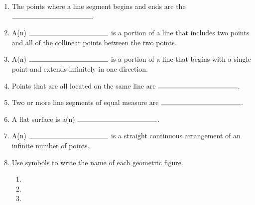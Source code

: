 \documentclass[12pt, oneside]{article}
\begin{document}
\begin{enumerate}
  \newpage
    \item The points where a line segment begins and ends are the $\rule{4cm}{0.15mm}$. \bigskip
    \item A(n) $\rule{4cm}{0.15mm}$ is a portion of a line that includes two points and all of the collinear points between the two points.\bigskip
    \item A(n) $\rule{4cm}{0.15mm}$ is a portion of a line that begins with a single point and extends infinitely in one direction.
    \item Points that are all located on the same line are $\rule{4cm}{0.15mm}$.\bigskip
    \item Two or more line segments of equal measure are $\rule{4cm}{0.15mm}$.\bigskip
    \item A flat surface is a(n) $\rule{4cm}{0.15mm}$. \bigskip
    \item A(n) $\rule{4cm}{0.15mm}$ is a straight continuous arrangement of an infinite number of points.
    \bigskip
  \item Use symbols to write the name of each geometric figure.
  \begin{enumerate}
  \item %
     \bigskip
  \item \hspace{1cm}%
     \bigskip
    \item %
  \end{enumerate}

\end{enumerate}
\end{document}
